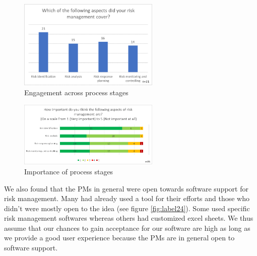 \begin{figure}[H]
	\centering
	\includegraphics[width=0.6\textwidth]{Assets/survey_results/Q3.png}
	\caption{Engagement across process stages}
	\label{fig:label22}
\end{figure}
\begin{figure}[H]
	\centering
	\includegraphics[width=0.6\textwidth]{Assets/survey_results/Q4.png}
	\caption{Importance of process stages}
	\label{fig:label23}
\end{figure}

We also found that the PMs in general were open towards software support for risk management. Many had already used a tool for their efforts and those who didn't were mostly open to the idea (see figure \ref{fig:label24}). Some used specific risk management softwares whereas others had customized excel sheets. We thus assume that our chances to gain acceptance for our software are high as long as we provide a good user experience because the PMs are in general open to software support.

